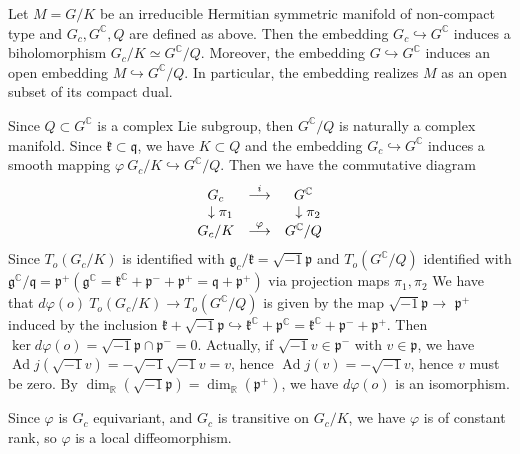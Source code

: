 \begin{theorem}
	Let $M=G / K$ be an irreducible Hermitian symmetric manifold
	of non-compact type and $G_{c}, G^{\mathbb{C}}, Q$ are
	defined as above. Then the embedding $G_{c} \hookrightarrow
	G^{\mathbb{C}}$ induces a biholomorphism $G_{c} / K \simeq
	G^{\mathbb{C}} / Q .$ Moreover, the embedding $G
	\hookrightarrow G^{\mathbb{C}}$ induces an open embedding $M
	\hookrightarrow G^{\mathbb{C}} / Q .$ In particular, the
	embedding realizes $M$ as an open subset of its compact dual.
\end{theorem}
\bproof
Since $Q \subset G^{\mathbb{C}}$ is a complex Lie subgroup, then
$G^{\mathbb{C}} / Q$ is naturally a complex manifold. Since
$\mathfrak{k} \subset \mathfrak{q}$, we have $K \subset Q$ and
the embedding $G_{c} \hookrightarrow G^{\mathbb{C}}$ induces a
smooth mapping $\varphi\: G_{c} / K \hookrightarrow G^{\mathbb{C}}
/ Q$. Then we have the commutative
diagram
\[
\begin{matrix}
	G_c&\stackrel{i}{\longrightarrow}&G^{{\mathbb C}}\\
	\ \ \downarrow \pi_1& &\ \ \downarrow \pi_2\\
	G_c/K&\stackrel{\varphi}{\longrightarrow}&G^{{\mathbb C}}/Q
\end{matrix}
\]
Since $T_{o}\left(G_{c} / K\right)$ is identified with
$\mathfrak{g}_{c} / \mathfrak{k}=\sqrt{-1} \mathfrak{p}$ and
$T_{o}\left(G^{\mathbb{C}} / Q\right)$ identified with
$\mathfrak{g}^{\mathbb{C}} /
\mathfrak{q}=\mathfrak{p}^{+}\left(\mathfrak{g}^{\mathbb{C}}
=\mathfrak{k}^{\mathbb{C}}+\mathfrak{p}^{-}+\mathfrak{p}^{+}
=\mathfrak{q}+\mathfrak{p}^{+}\right)$ via projection maps $\pi_{1},\pi_{2}$
We have that $d \varphi(o)\: T_{o}\left(G_{c} / K\right)
\rightarrow T_{o}\left(G^{\mathbb{C}} / Q\right)$ is given by the
map $\sqrt{-1} \mathfrak{p} \rightarrow$
$\mathfrak{p}^{+}$ induced by the inclusion
$\mathfrak{k}+\sqrt{-1} \mathfrak{p} \hookrightarrow
\mathfrak{k}^{\mathbb{C}}+\mathfrak{p}^{\mathbb{C}}=
\mathfrak{k}^{\mathbb{C}}+\mathfrak{p}^{-}+\mathfrak{p}^{+}$. Then
$\operatorname{ker} d \varphi(o)=\sqrt{-1} \mathfrak{p} \cap
\mathfrak{p}^{-}=0$. Actually, if $\sqrt{-1} v \in
\mathfrak{p}^{-}$ with $v \in \mathfrak{p}$, we have
$\operatorname{Ad} j(\sqrt{-1} v)=-\sqrt{-1} \sqrt{-1} v=v$,
hence $\operatorname{Ad} j(v)=-\sqrt{-1} v$, hence $v$ must
be zero. By $\operatorname{dim}_{\mathbb{R}}(\sqrt{-1}
\mathfrak{p})=\operatorname{dim}_{\mathbb{R}}\left(\mathfrak{p}^{+}
\right)$, we have $d \varphi(o)$ is an isomorphism.

Since $\varphi$ is $G_{c}$ equivariant, and $G_{c}$ is transitive
on $G_{c} / K$, we have $\varphi$ is of
constant rank, so $\varphi$ is a local diffeomorphism. 

